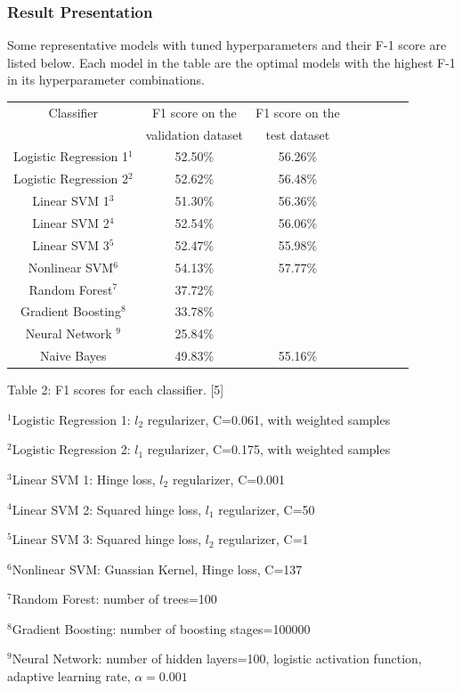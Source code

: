 \documentclass{article}
\begin{document}
\subsubsection{Result Presentation}
Some representative models with tuned hyperparameters and their F-1 score are listed below. Each model in the table are the optimal models with the highest F-1 in its hyperparameter combinations.\\
\begin{center} 
    \begin{tabular}{|c|c|c|c|c|c|c|c|} 
       \hline 
       Classifier & F1 score on the & F1 score on the\\
       & validation dataset & test dataset\\
       \hline
       Logistic Regression 1$^1$ & 52.50\% &56.26\% \\
       \hline
       Logistic Regression 2$^2$ & 52.62\% & 56.48\% \\
       \hline
       Linear SVM 1$^3$ & 51.30\% & 56.36\%\\
       \hline
       Linear SVM 2$^4$ & 52.54\% &56.06\% \\
       \hline
       Linear SVM 3$^5$ & 52.47\% &55.98\%\\
       \hline
       Nonlinear SVM$^6$ & 54.13\%&57.77\%\\
       \hline
       Random Forest$^7$ & 37.72\%&\\
       \hline
       Gradient Boosting$^{8}$& 33.78\%&\\
       \hline
       Neural Network $^{9}$ &25.84\%&\\
       \hline
       Naive Bayes &49.83\%&55.16\%\\
       \hline
    \end{tabular} 
\end{center}
\centerline
{Table 2: F1 scores for each classifier. [5]}
\centerline
{\small $^1$Logistic Regression 1: $l_2$ regularizer, C=0.061, with weighted samples}
\centerline
{\small $^2$Logistic Regression 2: $l_1$ regularizer, C=0.175, with weighted samples}
\centerline
{\small $^3$Linear SVM 1: Hinge loss, $l_2$ regularizer, C=0.001}
\centerline
{\small $^4$Linear SVM 2: Squared hinge loss, $l_1$ regularizer, C=50}
\centerline
{\small $^5$Linear SVM 3: Squared hinge loss, $l_2$ regularizer, C=1}
\centerline
{\small $^6$Nonlinear SVM: Guassian Kernel, Hinge loss, C=137}
\centerline
{\small $^7$Random Forest: number of trees=100}
\centerline
{\small $^{8}$Gradient Boosting: number of boosting stages=100000}
\centerline
{\small $^{9}$Neural Network: number of hidden layers=100, logistic activation function, adaptive learning rate, $\alpha=0.001$}
\end{document}
